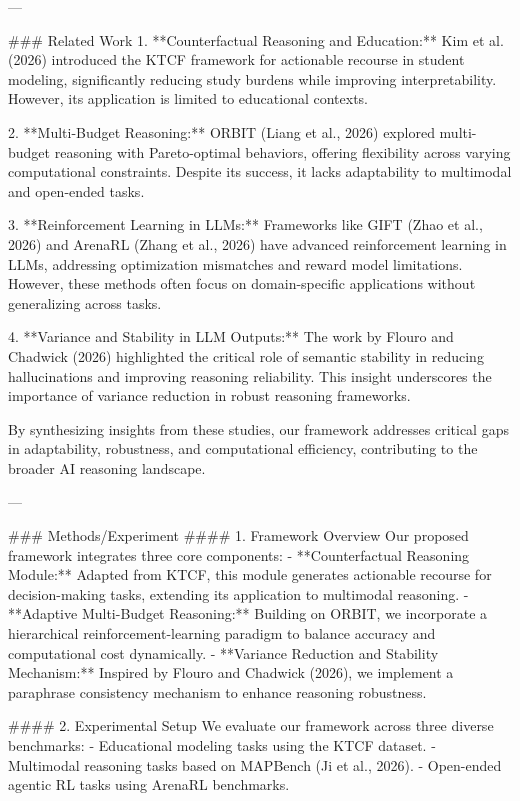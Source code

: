 ---

### Related Work
1. **Counterfactual Reasoning and Education:**
   Kim et al. (2026) introduced the KTCF framework for actionable recourse in student modeling, significantly reducing study burdens while improving interpretability. However, its application is limited to educational contexts.

2. **Multi-Budget Reasoning:**
   ORBIT (Liang et al., 2026) explored multi-budget reasoning with Pareto-optimal behaviors, offering flexibility across varying computational constraints. Despite its success, it lacks adaptability to multimodal and open-ended tasks.

3. **Reinforcement Learning in LLMs:**
   Frameworks like GIFT (Zhao et al., 2026) and ArenaRL (Zhang et al., 2026) have advanced reinforcement learning in LLMs, addressing optimization mismatches and reward model limitations. However, these methods often focus on domain-specific applications without generalizing across tasks.

4. **Variance and Stability in LLM Outputs:**
   The work by Flouro and Chadwick (2026) highlighted the critical role of semantic stability in reducing hallucinations and improving reasoning reliability. This insight underscores the importance of variance reduction in robust reasoning frameworks.

By synthesizing insights from these studies, our framework addresses critical gaps in adaptability, robustness, and computational efficiency, contributing to the broader AI reasoning landscape.

---

### Methods/Experiment
#### 1. Framework Overview
Our proposed framework integrates three core components:
   - **Counterfactual Reasoning Module:** Adapted from KTCF, this module generates actionable recourse for decision-making tasks, extending its application to multimodal reasoning.
   - **Adaptive Multi-Budget Reasoning:** Building on ORBIT, we incorporate a hierarchical reinforcement-learning paradigm to balance accuracy and computational cost dynamically.
   - **Variance Reduction and Stability Mechanism:** Inspired by Flouro and Chadwick (2026), we implement a paraphrase consistency mechanism to enhance reasoning robustness.

#### 2. Experimental Setup
We evaluate our framework across three diverse benchmarks:
   - Educational modeling tasks using the KTCF dataset.
   - Multimodal reasoning tasks based on MAPBench (Ji et al., 2026).
   - Open-ended agentic RL tasks using ArenaRL benchmarks.

